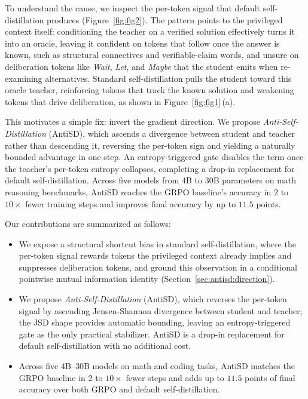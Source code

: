 \documentclass{llmxive}
\begin{document}
To understand the cause, we inspect the per-token signal that default self-distillation produces (Figure~\ref{fig:fig2}). The pattern points to the privileged context itself: conditioning the teacher on a verified solution effectively turns it into an oracle, leaving it confident on tokens that follow once the answer is known, such as structural connectives and verifiable-claim words, and unsure on deliberation tokens like \emph{Wait}, \emph{Let}, and \emph{Maybe} that the student emits when re-examining alternatives. Standard self-distillation pulls the student toward this oracle teacher, reinforcing tokens that track the known solution and weakening tokens that drive deliberation, as shown in Figure~\ref{fig:fig1}\,(a).

This motivates a simple fix: invert the gradient direction. We propose \emph{Anti-Self-Distillation} (AntiSD), which ascends a divergence between student and teacher rather than descending it, reversing the per-token sign and yielding a naturally bounded advantage in one step. An entropy-triggered gate disables the term once the teacher's per-token entropy collapses, completing a drop-in replacement for default self-distillation. Across five models from 4B to 30B parameters on math reasoning benchmarks, AntiSD reaches the GRPO baseline's accuracy in $2$ to $10\times$ fewer training steps and improves final accuracy by up to $11.5$ points.

Our contributions are summarized as follows:
\begin{itemize}[leftmargin=10pt,itemsep=-1pt]
  \item We expose a structural shortcut bias in standard self-distillation, where the per-token signal rewards tokens the privileged context already implies and suppresses deliberation tokens, and ground this observation in a conditional pointwise mutual information identity (Section~\ref{sec:antisd:direction}).
  \item We propose \emph{Anti-Self-Distillation} (AntiSD), which reverses the per-token signal by ascending Jensen-Shannon divergence between student and teacher; the JSD shape provides automatic bounding, leaving an entropy-triggered gate as the only practical stabilizer. AntiSD is a drop-in replacement for default self-distillation with no additional cost.
  \item Across five 4B--30B models on math and coding tasks, AntiSD matches the GRPO baseline in $2$ to $10\times$ fewer steps and adds up to $11.5$ points of final accuracy over both GRPO and default self-distillation.
\end{itemize}
\end{document}
